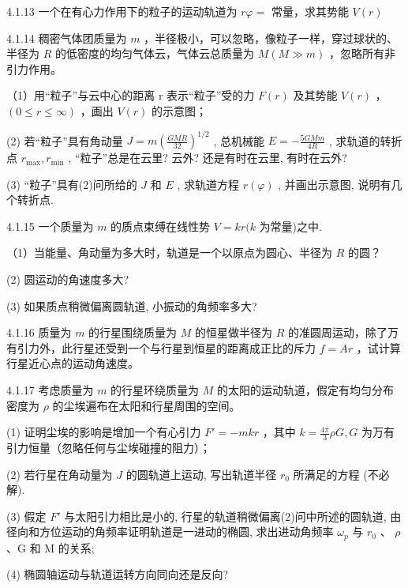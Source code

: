 \begin{problem}{4.1.13}
一个在有心力作用下的粒子的运动轨道为 $r\varphi =$ 常量，求其势能 $V(r)$
\end{problem}
\clearpage


\begin{problem}{4.1.14}
稠密气体团质量为 $m$ ，半径极小，可以忽略，像粒子一样，穿过球状的、半径为 $R$ 的低密度的均匀气体云，气体云总质量为 $M(M \gg m)$ ，忽略所有非引力作用。

（1）用“粒子”与云中心的距离 r 表示“粒子”受的力 $F(r)$ 及其势能 $V(r)$ ， $(0 \leqslant r \leqslant \infty)$ ，画出 $V(r)$ 的示意图；

(2) 若“粒子”具有角动量 $J = m\left(\frac{GMR}{32}\right)^{1/2}$ , 总机械能 $E = -\frac{5GMm}{4R}$ , 求轨道的转折点 $r_{\max}, r_{\min}$ , “粒子”总是在云里? 云外? 还是有时在云里, 有时在云外?

(3) “粒子”具有(2)问所给的 $J$ 和 $E$ , 求轨道方程 $r(\varphi)$ , 并画出示意图, 说明有几个转折点.
\end{problem}
\clearpage


\begin{problem}{4.1.15}
一个质量为 $m$ 的质点束缚在线性势 $V = kr(k$ 为常量)之中.

（1）当能量、角动量为多大时，轨道是一个以原点为圆心、半径为 $R$ 的圆？

(2) 圆运动的角速度多大?

(3) 如果质点稍微偏离圆轨道, 小振动的角频率多大?
\begin{center}

\end{center}
\end{problem}
\clearpage


\begin{problem}{4.1.16}
质量为 $m$ 的行星围绕质量为 $M$ 的恒星做半径为 $R$ 的准圆周运动，除了万有引力外，此行星还受到一个与行星到恒星的距离成正比的斥力 $f = Ar$ ，试计算行星近心点的运动角速度。
\end{problem}
\clearpage


\begin{problem}{4.1.17}
考虑质量为 $m$ 的行星环绕质量为 $M$ 的太阳的运动轨道，假定有均匀分布密度为 $\rho$ 的尘埃遍布在太阳和行星周围的空间。

(1) 证明尘埃的影响是增加一个有心引力 $F' = -mkr$ ，其中 $k = \frac{4\pi}{3}\rho G, G$ 为万有引力恒量（忽略任何与尘埃碰撞的阻力）；

(2) 若行星在角动量为 $J$ 的圆轨道上运动, 写出轨道半径 $r_0$ 所满足的方程 (不必解).

(3) 假定 $F'$ 与太阳引力相比是小的, 行星的轨道稍微偏离(2)问中所述的圆轨道, 由径向和方位运动的角频率证明轨道是一进动的椭圆, 求出进动角频率 $\omega_{p}$ 与 $r_{0}$ 、 $\rho$ 、G 和 M 的关系;

(4) 椭圆轴运动与轨道运转方向同向还是反向?
\end{problem}
\clearpage


